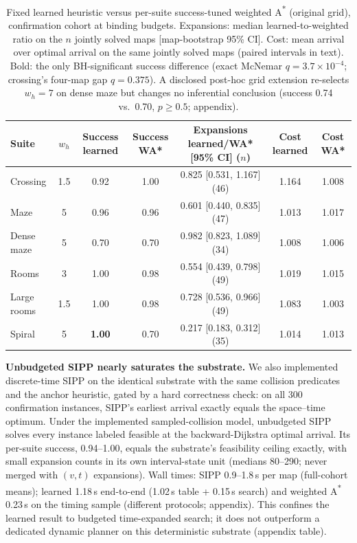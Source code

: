 \documentclass[letterpaper]{article} %
\begin{document}
\begin{table}[t]
\centering
\small
\begin{tabular}{lcccccc}
\toprule
Suite & $w_h$ & Success learned & Success WA* & Expansions learned/WA* [95\% CI] ($n$) & Cost learned & Cost WA* \\
\midrule
Crossing & 1.5 & 0.92 & 1.00 & 0.825 [0.531, 1.167] (46) & 1.164 & 1.008 \\
Maze & 5 & 0.96 & 0.96 & 0.601 [0.440, 0.835] (47) & 1.013 & 1.017 \\
Dense maze & 5 & 0.70 & 0.70 & 0.982 [0.823, 1.089] (34) & 1.008 & 1.006 \\
Rooms & 3 & 1.00 & 0.98 & 0.554 [0.439, 0.798] (49) & 1.019 & 1.015 \\
Large rooms & 1.5 & 1.00 & 0.98 & 0.728 [0.536, 0.966] (49) & 1.083 & 1.003 \\
Spiral & 5 & \textbf{1.00} & 0.70 & 0.217 [0.183, 0.312] (35) & 1.014 & 1.013 \\
\bottomrule
\end{tabular}
\caption{Fixed learned heuristic versus per-suite success-tuned weighted A\textsuperscript{*} (original grid), confirmation cohort at binding budgets. Expansions: median learned-to-weighted ratio on the $n$ jointly solved maps [map-bootstrap 95\% CI]. Cost: mean arrival over optimal arrival on the same jointly solved maps (paired intervals in text). Bold: the only BH-significant success difference (exact McNemar $q{=}3.7\times10^{-4}$; crossing's four-map gap $q{=}0.375$). A disclosed post-hoc grid extension re-selects $w_h{=}7$ on dense maze but changes no inferential conclusion (success 0.74 vs.\ 0.70, $p \geq 0.5$; appendix).}
\label{tab:wastar-main}
\end{table}

\textbf{Unbudgeted SIPP nearly saturates the substrate.} We also implemented discrete-time SIPP \citep{phillips2011sipp} on the identical substrate with the same collision predicates and the anchor heuristic, gated by a hard correctness check: on all 300 confirmation instances, SIPP's earliest arrival exactly equals the space--time optimum. Under the implemented sampled-collision model, unbudgeted SIPP solves every instance labeled feasible at the backward-Dijkstra optimal arrival. Its per-suite success, 0.94--1.00, equals the substrate's feasibility ceiling exactly, with small expansion counts in its own interval-state unit (medians 80--290; never merged with $(v,t)$ expansions). Wall times: SIPP 0.9--1.8\,s per map (full-cohort means); learned 1.18\,s end-to-end (1.02\,s table + 0.15\,s search) and weighted A\textsuperscript{*} 0.23\,s on the timing sample (different protocols; appendix). This confines the learned result to budgeted time-expanded search; it does not outperform a dedicated dynamic planner on this deterministic substrate (appendix table).
\end{document}
